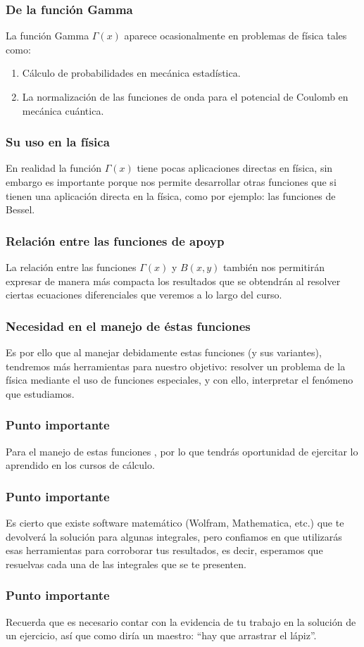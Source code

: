 \documentclass[12pt]{beamer}
\begin{document}
\begin{frame}
\frametitle{De la función Gamma}
La función Gamma $\Gamma (x)$ aparece ocasionalmente en problemas de física tales como:
\pause
{}
\begin{enumerate}[<+->]
\item Cálculo de probabilidades en mecánica estadística.
\item La normalización de las funciones de onda para el potencial de Coulomb en mecánica cuántica.
\end{enumerate}
\end{frame}
\begin{frame}
\frametitle{Su uso en la física}
En realidad la función $\Gamma (x)$ tiene pocas aplicaciones directas en física, \pause sin embargo es importante porque nos permite desarrollar otras funciones que si tienen una aplicación directa en la física, como por ejemplo: las funciones de Bessel.
\end{frame}
\begin{frame}
\frametitle{Relación entre las funciones de apoyp}
La relación entre las funciones $\Gamma (x)$ y $B (x, y)$ también nos permitirán expresar de manera más compacta los resultados que se obtendrán al resolver ciertas ecuaciones diferenciales que veremos a lo largo del curso.
\end{frame}
\begin{frame}
\frametitle{Necesidad en el manejo de éstas funciones}
Es por ello que al manejar debidamente estas funciones (y sus variantes), tendremos más herramientas para nuestro objetivo: \pause resolver un problema de la física mediante el uso de funciones especiales, y con ello, interpretar el fenómeno que estudiamos.
\end{frame}
\begin{frame}
\frametitle{Punto importante}
Para el manejo de estas funciones , por lo que tendrás oportunidad de ejercitar lo aprendido en los cursos de cálculo.
\end{frame}
\begin{frame}
\frametitle{Punto importante}
Es cierto que existe software matemático (Wolfram, Mathematica, etc.) que te devolverá la solución para algunas integrales, pero confiamos en que utilizarás esas herramientas para corroborar tus resultados, es decir, \pause esperamos que resuelvas  cada una de las integrales que se te presenten.
\end{frame}
\begin{frame}
\frametitle{Punto importante}
Recuerda que es necesario contar con la evidencia de tu trabajo en la solución de un ejercicio, así que como diría un maestro: \enquote{hay que arrastrar el lápiz}.
\end{frame}
\end{document}
